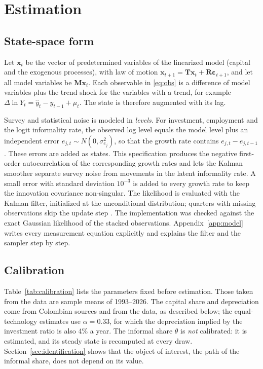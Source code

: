 \section{Estimation}
\label{sec:estimation}

\subsection{State-space form}

Let $\bm{x}_t$ be the vector of predetermined variables of the linearized model (capital and the exogenous processes), with law of motion $\bm{x}_{t+1} = \bm{T}\bm{x}_t + \bm{R}\bm{\varepsilon}_{t+1}$, and let all model variables be $\bm{M}\bm{x}_t$. Each observable in \eqref{eq:obs} is a difference of model variables plus the trend shock for the variables with a trend, for example $\Delta\ln Y_t = \hat y_t - \hat y_{t-1} + \mu_t$. The state is therefore augmented with its lag.

Survey and statistical noise is modeled in \emph{levels}. For investment, employment and the logit informality rate, the observed log level equals the model level plus an independent error $e_{j,t}\sim N(0,\sigma^2_{e_j})$, so that the growth rate contains $e_{j,t}-e_{j,t-1}$. These errors are added as states. This specification produces the negative first-order autocorrelation of the corresponding growth rates and lets the Kalman smoother separate survey noise from movements in the latent informality rate. A small error with standard deviation $10^{-3}$ is added to every growth rate to keep the innovation covariance non-singular. The likelihood is evaluated with the Kalman filter, initialized at the unconditional distribution; quarters with missing observations skip the update step \citep{DurbinKoopman2012}. The implementation was checked against the exact Gaussian likelihood of the stacked observations. Appendix~\ref{app:model} writes every measurement equation explicitly and explains the filter and the sampler step by step.

\subsection{Calibration}

Table~\ref{tab:calibration} lists the parameters fixed before estimation. Those taken from the data are sample means of 1993--2026. The capital share and depreciation come from Colombian sources and from the data, as described below; the equal-technology estimates use $\alpha=0.33$, for which the depreciation implied by the investment ratio is also 4\% a year. The informal share $\theta$ is \emph{not} calibrated: it is estimated, and its steady state is recomputed at every draw. Section~\ref{sec:identification} shows that the object of interest, the path of the informal share, does not depend on its value.

